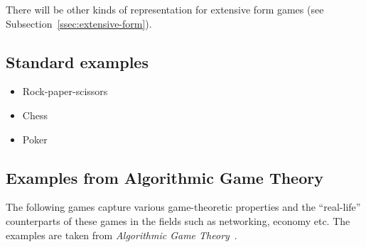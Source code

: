There will be other kinds of representation for extensive form games (see Subsection~\ref{ssec:extensive-form}).

\subsection{Standard examples}

\todo %

\begin{itemize}
  \item{Rock-paper-scissors}
  \item{Chess}
  \item{Poker}
\end{itemize}

\subsection{Examples from Algorithmic Game Theory}

The following games capture various game-theoretic properties and the ``real-life'' counterparts of these games in the fields such as networking, economy etc.
The examples are taken from \emph{Algorithmic Game Theory}~\cite{AGT07}.

